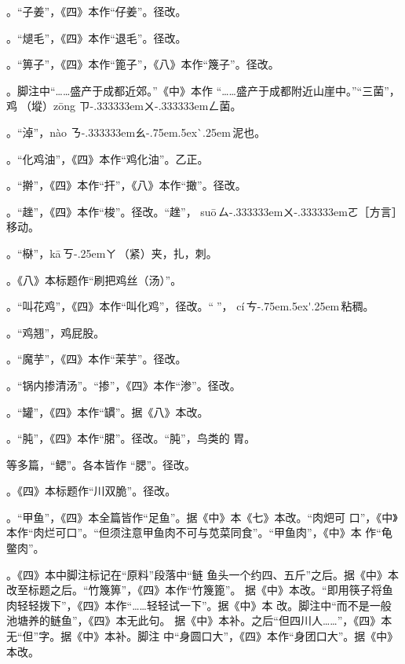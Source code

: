 。“子姜”，《四》本作“仔姜”。径改。

。“煺毛”，《四》本作“退毛”。径改。

。“箅子”，《四》本作“篦子”，《八》本作“篾子”。径改。

。脚注{\footnotesize{}}中“……盛产于成都近郊。”《中》本作
“……盛产于成都附近山崖中。”“三菌”，鸡𭎂（㙡）{z\={o}ng}%
{ㄗ\kern-.333333emㄨ\kern-.333333emㄥ}菌。

。“淖”，{n\`{a}o}%
{ㄋ\kern-.333333emㄠ\kern-.75em\raise.5ex\hbox{\`{}}\kern.25em}\,泥也。

。“化鸡油”，《四》本作“鸡化油”。乙正。

。“擀”，《四》本作“扞”，《八》本作“撖”。径改。

。“趖”，《四》本作“梭”。径改。“趖”，
{su\={o}}\,{ㄙ\kern-.333333emㄨ\kern-.333333emㄛ}［方言］移动。

。“㮟”，{k\={a}}\,{ㄎ\kern-.25emㄚ}\,（紧）夹，扎，刺。

。《八》本标题作“刷把鸡丝（汤）”。

。“叫花鸡”，《四》本作“叫化鸡”，径改。“𫃕”，%
{c\'{i}}\,{ㄘ\kern-.75em\raise.5ex\hbox{\'{}}\kern.25em}\,粘稠。

。“鸡翘”，鸡屁股。

。“魔芋”，《四》本作“茉芋”。径改。

。“锅内掺清汤”。“掺”，《四》本作“渗”。径改。

。“罐”，《四》本作“罆”。据《八》本改。

。“肫”，《四》本作“𬂁”。径改。“肫”，鸟类的
胃。

等多篇，“鳃”。各本皆作
“腮”。径改。

。《四》本标题作“川双脆”。径改。

。“甲鱼”，《四》本全篇皆作“足鱼”。据《中》本《七》本改。“肉𤆵可
口”，《中》本作“肉烂可口”。“但须注意甲鱼肉不可与苋菜同食”。“甲鱼肉”，《中》本
作“龟鳖肉”。

。《四》本中脚注标记{\footnotesize{}}在“原料”段落中“鲢
鱼头一个约四、五斤”之后。据《中》本改至标题之后。“竹篾箅”，《四》本作“竹篾篦”。
据《中》本改。“即用筷子将鱼肉轻轻拨下”，《四》本作“……轻轻试一下”。据《中》本
改。脚注{\footnotesize{}}中“而不是一般池塘养的鲢鱼”，《四》本无此句。
据《中》本补。之后“但四川人……”，《四》本无“但”字。据《中》本补。脚注
{\footnotesize{}}中“身圆口大”，《四》本作“身团口大”。据《中》本改。

